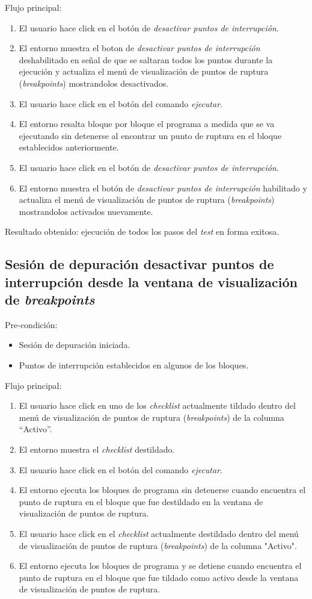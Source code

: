 Flujo principal:
\begin{enumerate}
	\item
	El usuario hace click en el botón de \emph{desactivar puntos de interrupción}.
	\item
	El entorno muestra el boton de \emph{desactivar puntos de interrupción} deshabilitado en señal de que se saltaran todos los puntos durante la ejecución  y actualiza el menú de visualización de puntos de ruptura (\emph{breakpoints}) mostrandolos desactivados.
	\item
	El usuario hace click en el botón del comando \emph{ejecutar}.
	\item
	El entorno resalta bloque por bloque el programa a medida que se va ejecutando sin detenerse al encontrar un punto de ruptura en el bloque establecidos anteriormente.
	\item
	El usuario hace click en el botón de \emph{desactivar puntos de interrupción}.
	\item
	El entorno muestra el botón de \emph{desactivar puntos de interrupción} habilitado y actualiza el menú de visualización de puntos de ruptura (\emph{breakpoints}) mostrandolos activados nuevamente.
\end{enumerate}

Resultado obtenido: ejecución de todos los pasos del \emph{test} en forma exitosa. 


\subsection{Sesión de depuración desactivar puntos de interrupción desde la ventana de visualización de \emph{breakpoints}}
Pre-condición:
\begin{itemize}
	\item Sesión de depuración iniciada.
	\item Puntos de interrupción establecidos en algunos de los bloques.
\end{itemize}

Flujo principal:
\begin{enumerate}
	\item
	El usuario hace click en uno de los \emph{checklist} actualmente tildado dentro del menú de visualización de puntos de ruptura (\emph{breakpoints}) de la columna “Activo”.
	\item
	El entorno muestra el \emph{checklist} destildado.
	\item
	El usuario hace click en el botón del comando \emph{ejecutar}.
	\item
	El entorno ejecuta los bloques de programa sin detenerse cuando encuentra el punto de ruptura en el bloque que fue destildado en la ventana de visualización de puntos de ruptura.
	\item
	El usuario hace click en el \emph{checklist} actualmente destildado dentro del menú de visualización de puntos de ruptura (\emph{breakpoints}) de la columna "Activo".
	\item
	El entorno ejecuta los bloques de programa y se detiene cuando encuentra el punto de ruptura en el bloque que fue tildado como activo desde la ventana de visualización de puntos de ruptura.
\end{enumerate}

